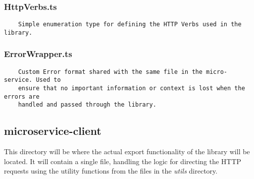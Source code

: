 \subsubsection{HttpVerbs.ts}
\begin{verbatim}
    Simple enumeration type for defining the HTTP Verbs used in the library.
\end{verbatim}
\subsubsection{ErrorWrapper.ts}
\begin{verbatim}
    Custom Error format shared with the same file in the micro-service. Used to
    ensure that no important information or context is lost when the errors are
    handled and passed through the library.
\end{verbatim}
\subsection{microservice-client}
This directory will be where the actual export functionality of the library will be located. It will contain a single file, handling the logic for directing the HTTP requests using the utility functions from the files in the \emph{utils} directory.
